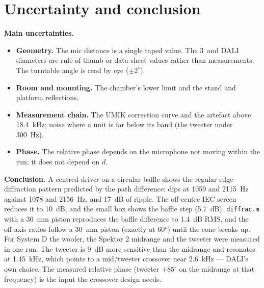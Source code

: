 \documentclass[a4paper,10pt]{article}
\newcommand{\file}[1]{\nolinkurl{#1}}
\begin{document}
\section{Uncertainty and conclusion}
\textbf{Main uncertainties.}
\begin{itemize}
\item \textbf{Geometry.} The mic distance is a single taped value. The 3\,\textquotedbl{} and DALI
  diameters are rule-of-thumb or data-sheet values rather than measurements. The turntable angle is
  read by eye ($\pm 2^\circ$).
\item \textbf{Room and mounting.} The chamber's lower limit and the stand and platform reflections.
\item \textbf{Measurement chain.} The UMIK correction curve and the artefact above \SI{18.4}{kHz}; noise
  where a unit is far below its band (the tweeter under \SI{300}{Hz}).
\item \textbf{Phase.} The relative phase depends on the microphone not moving within the run; it does
  not depend on $d$.
\end{itemize}

\textbf{Conclusion.} A centred driver on a circular baffle shows the regular edge-diffraction
pattern predicted by the path difference: dips at \SI{1059}{} and \SI{2115}{Hz} against
\SI{1078}{} and \SI{2156}{Hz}, and \SI{17}{dB} of ripple. The off-centre IEC screen reduces it to \SI{10}{dB},
and the small box shows the baffle step (\SI{5.7}{dB}). \file{diffrac.m} with a \SI{30}{mm} piston reproduces
the baffle difference to \SI{1.4}{dB} RMS, and the off-axis ratios follow a \SI{30}{mm} piston
(exactly at 60°) until the cone breaks up. For System D the woofer, the Spektor 2 midrange and the
tweeter were measured in one run. The tweeter is \SI{9}{dB} more sensitive than the midrange and resonates at
\SI{1.45}{kHz}, which points to a mid/tweeter crossover near \SI{2.6}{kHz} --- DALI's own choice. The
measured relative phase (tweeter $+85^\circ$ on the midrange at that frequency) is the input the crossover
design needs.
\end{document}
